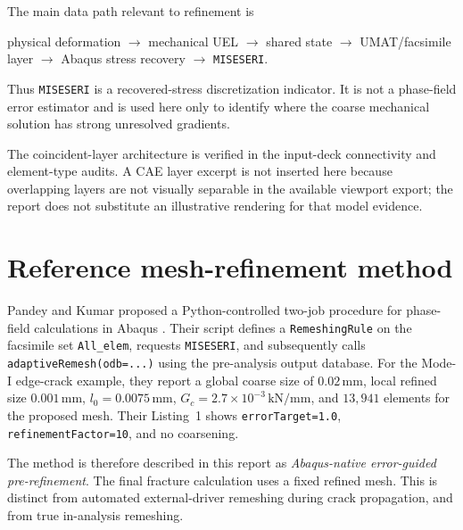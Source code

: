 The main data path relevant to refinement is
\begin{center}
physical deformation $\rightarrow$ mechanical UEL $\rightarrow$ shared state $\rightarrow$ UMAT/facsimile layer $\rightarrow$ Abaqus stress recovery $\rightarrow$ \texttt{MISESERI}.
\end{center}
Thus \texttt{MISESERI} is a recovered-stress discretization indicator. It is not a phase-field error estimator and is used here only to identify where the coarse mechanical solution has strong unresolved gradients.

The coincident-layer architecture is verified in the input-deck connectivity and element-type audits. A CAE layer excerpt is not inserted here because overlapping layers are not visually separable in the available viewport export; the report does not substitute an illustrative rendering for that model evidence.

\section{Reference mesh-refinement method}
Pandey and Kumar proposed a Python-controlled two-job procedure for phase-field calculations in Abaqus \citep{Pandey2025}. Their script defines a \texttt{RemeshingRule} on the facsimile set \texttt{All\_elem}, requests \texttt{MISESERI}, and subsequently calls \texttt{adaptiveRemesh(odb=...)} using the pre-analysis output database. For the Mode-I edge-crack example, they report a global coarse size of $0.02\,\mathrm{mm}$, local refined size $0.001\,\mathrm{mm}$, $l_0=0.0075\,\mathrm{mm}$, $G_c=2.7\times10^{-3}\,\mathrm{kN/mm}$, and $13{,}941$ elements for the proposed mesh. Their Listing~1 shows \texttt{errorTarget=1.0}, \texttt{refinementFactor=10}, and no coarsening.

The method is therefore described in this report as \emph{Abaqus-native error-guided pre-refinement}. The final fracture calculation uses a fixed refined mesh. This is distinct from automated external-driver remeshing during crack propagation, and from true in-analysis remeshing.

